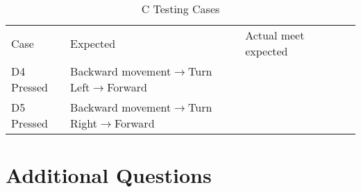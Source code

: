 \documentclass[12pt,letterpaper]{article}
\begin{document}
\begin{table}[h]
	\centering
	\begin{tabular}{|l|l|l|ll}
		\cline{1-3}
		Case & Expected & Actual meet expected &  &  \\ \cline{1-3}
	D4 Pressed	&Backward movement$\rightarrow$Turn Left$\rightarrow$Forward&\checkmark&  &  \\ \cline{1-3}
	D5 Pressed	&Backward movement$\rightarrow$Turn Right$\rightarrow$Forward&\checkmark&  &  \\ \cline{1-3}
	\end{tabular}
	\caption{C Testing Cases}
\end{table}

\section{Additional Questions}
\end{document}
